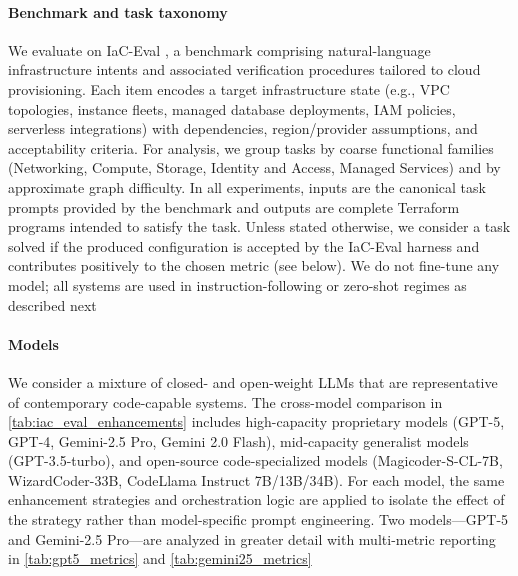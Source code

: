 \documentclass[manuscript,screen,nonacm]{acmart}
\begin{document}
\paragraph{Benchmark and task taxonomy}
We evaluate on IaC-Eval \cite{kon2024iac}, a benchmark comprising natural-language infrastructure intents and associated verification procedures tailored to cloud provisioning. Each item encodes a target infrastructure state (e.g., VPC topologies, instance fleets, managed database deployments, IAM policies, serverless integrations) with dependencies, region/provider assumptions, and acceptability criteria. For analysis, we group tasks by coarse functional families (Networking, Compute, Storage, Identity and Access, Managed Services) and by approximate graph difficulty. In all experiments, inputs are the canonical task prompts provided by the benchmark and outputs are complete Terraform programs intended to satisfy the task. Unless stated otherwise, we consider a task solved if the produced configuration is accepted by the IaC-Eval harness and contributes positively to the chosen metric (see below). We do not fine-tune any model; all systems are used in instruction-following or zero-shot regimes as described next

\paragraph{Models}
We consider a mixture of closed- and open-weight LLMs that are representative of contemporary code-capable systems. The cross-model comparison in \autoref{tab:iac_eval_enhancements} includes high-capacity proprietary models \cite{openai2022introducing} \cite{team2023gemini} (GPT-5, GPT-4, Gemini-2.5 Pro, Gemini 2.0 Flash), mid-capacity generalist models (GPT-3.5-turbo), and open-source code-specialized models (Magicoder-S-CL-7B, WizardCoder-33B, CodeLlama Instruct 7B/13B/34B). For each model, the same enhancement strategies and orchestration logic are applied to isolate the effect of the strategy rather than model-specific prompt engineering. Two models—GPT-5 and Gemini-2.5 Pro—are analyzed in greater detail with multi-metric reporting in \autoref{tab:gpt5_metrics} and \autoref{tab:gemini25_metrics}
\end{document}
